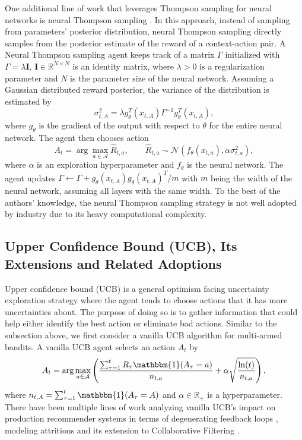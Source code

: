 One additional line of work that leverages Thompson sampling for neural networks is neural Thompson sampling \cite{zhang2021neural}. In this approach, instead of sampling from parameters' posterior distribution, neural Thompson sampling directly samples from the posterior estimate of the reward of a context-action pair. A Neural Thompson sampling agent keeps track of a matrix $\Gamma$ initialized with $\Gamma = \lambda \mathbf{I}$, $\mathbf{I} \in \mathbb{R}^{N \times N}$ is an identity matrix, where $\lambda > 0$ is a regularization parameter and $N$ is the parameter size of the neural network. Assuming a Gaussian distributed reward posterior, the variance of the distribution is estimated by
\begin{equation}
    \sigma^2_{t, A} = \lambda g_{\theta}^T(x_{t, A})\Gamma^{-1}g_{\theta}^T(x_{t, A}),
\end{equation}
where $g_\theta$ is the gradient of the output with respect to $\theta$ for the entire neural network. The agent then chooses action
\begin{equation}
    A_t = \arg\max_{a \in \mathcal{A}}\hat{R}_{t, a}, \qquad \hat{R}_{t, a} \sim \mathcal{N}(f_{\theta}(x_{t, a}), \alpha \sigma^2_{t, a}),
\end{equation}
where $\alpha$ is an exploration hyperparameter and $f_{\theta}$ is the neural network. The agent updates $\Gamma \leftarrow \Gamma + g_{\theta}(x_{t, A})g_{\theta}(x_{t, A})^T / m$ with $m$ being the width of the neural network, assuming all layers with the same width. To the best of the authors' knowledge, the neural Thompson sampling strategy is not well adopted by industry due to its heavy computational complexity. 

\subsection{Upper Confidence Bound (UCB), Its Extensions and Related Adoptions}
Upper confidence bound (UCB) is a general optimism facing uncertainty exploration strategy where the agent tends to choose actions that it has more uncertainties about. The purpose of doing so is to gather information that could help either identify the best action or eliminate bad actions. Similar to the subsection above, we first consider a vanilla UCB algorithm \cite{agrawal1995sample, auer2002finite} for multi-armed bandits. A vanilla UCB agent selects an action $A_t$ by 
\begin{equation}
    A_t = \arg\max_{a \in \mathcal{A}} \left(\frac{\sum_{\tau=1}^{t} R_\tau \mathbbm{1}(A_\tau = a)}{n_{t, a}} + \alpha\sqrt{\frac{\ln(t)}{n_{t, a}}}\right),
\end{equation}
where $n_{t, A} = \sum_{\tau = 1}^t \mathbbm{1}(A_\tau = A)$ and $\alpha \in \mathbb{R_+}$ is a hyperparameter. There have been multiple lines of work analyzing vanilla UCB's impact on production recommender systems in terms of degenerating feedback loops \cite{jiang2019degenerate}, modeling attritions \cite{ben2022modeling} and its extension to Collaborative Filtering \cite{nakamura2015ucb}.


